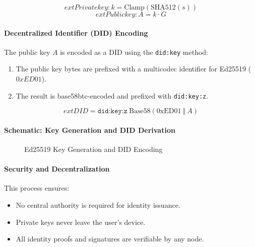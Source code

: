 \documentclass[12pt,a4paper]{report}
\begin{document}
\begin{equation}
  	ext{Private key: } k = \mathrm{Clamp}(\mathrm{SHA512}(s))
\end{equation}
\begin{equation}
  	ext{Public key: } A = k \cdot G
\end{equation}

\paragraph{Decentralized Identifier (DID) Encoding}
The public key $A$ is encoded as a DID using the \texttt{did:key} method:
\begin{enumerate}
  \item The public key bytes are prefixed with a multicodec identifier for Ed25519 ($0xED01$).
  \item The result is base58btc-encoded and prefixed with \texttt{did:key:z}.
\end{enumerate}

\begin{equation}
  	ext{DID} = \texttt{did:key:z}~\mathrm{Base58}(\text{0xED01}~\Vert~A)
\end{equation}

\paragraph{Schematic: Key Generation and DID Derivation}
\begin{figure}[h!]
  \centering
  \caption{Ed25519 Key Generation and DID Encoding}
\end{figure}

\paragraph{Security and Decentralization}
This process ensures:
\begin{itemize}
  \item No central authority is required for identity issuance.
  \item Private keys never leave the user's device.
  \item All identity proofs and signatures are verifiable by any node.
\end{itemize}
\end{document}
